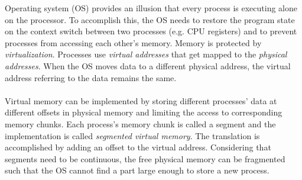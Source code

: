 Operating system (OS) provides an illusion that every process is executing alone
on the processor. To accomplish this, the OS needs to restore the program state
on the context switch between two processes (e.g. CPU registers) and to prevent 
processes from accessing each other's memory. Memory is protected by
\emph{virtualization}. Processes use \emph{virtual addresses} that get mapped to
the \emph{physical addresses}. When the OS moves data to a different physical 
address, the virtual address referring to the data remains the same.
\\
\\
Virtual memory can be implemented by storing different processes' data at 
different offsets in physical memory and limiting the access to corresponding 
memory chunks. Each process's memory chunk is called a segment and the 
implementation is called \emph{segmented virtual memory}. The translation is 
accomplished by adding an offset to the virtual address. Considering that 
segments need to be continuous, the free physical memory can be fragmented
such that the OS cannot find a part large enough to store a new process.
\\
\\
